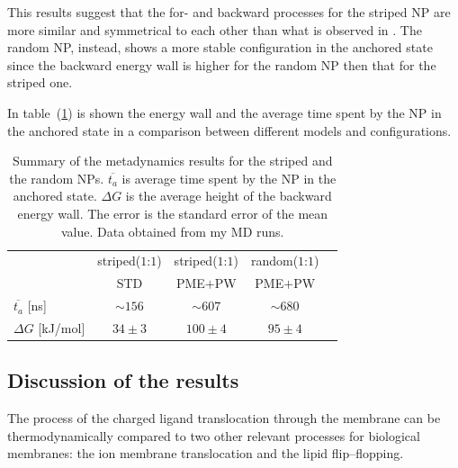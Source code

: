 This results suggest that the for- and backward processes for the striped \ac{NP} are more similar and symmetrical to each other than what is observed in \cite{ourPaper}. The random \ac{NP}, instead, shows a more stable configuration in the anchored state since the backward energy wall is higher for the random \ac{NP} then that for the striped one.

In table~(\ref{tab:anchorTime}) is shown the energy wall and the average time spent by the \ac{NP} in the anchored state in a comparison between different models and configurations.
\begin{table}[h!t]
	\centering
	\begin{tabular}{lcccc}
		\toprule
		\,					& striped($1$:$1$)	& striped($1$:$1$)	& random($1$:$1$)	\\
		\,					& STD & \acs{PME}$+$\acs{PW} & \acs{PME}$+$\acs{PW} \\ \toprule
	$\overline{t_{a}}$ [ns]	& $\sim 156$	& $\sim 607$	& $\sim 680$	\\ \midrule
	$\Delta G$ [kJ/mol] 	& $34 \pm 3$ 	& $100 \pm 4$ 	& $95 \pm 4$	\\ \bottomrule
	\end{tabular}
	\caption{Summary of the metadynamics results for the striped and the random \acp{NP}. $\overline{t_a}$ is average time spent by the \acs{NP} in the anchored state. $\Delta G$ is the average height of the backward energy wall. The error is the standard error of the mean value. Data obtained from my \acs{MD} runs.}
	\label{tab:anchorTime}
\end{table}

\subsection{Discussion of the results}
The process of the charged ligand translocation through the membrane can be thermodynamically compared to two other relevant processes for biological membranes: the ion membrane translocation and the lipid flip--flopping.

